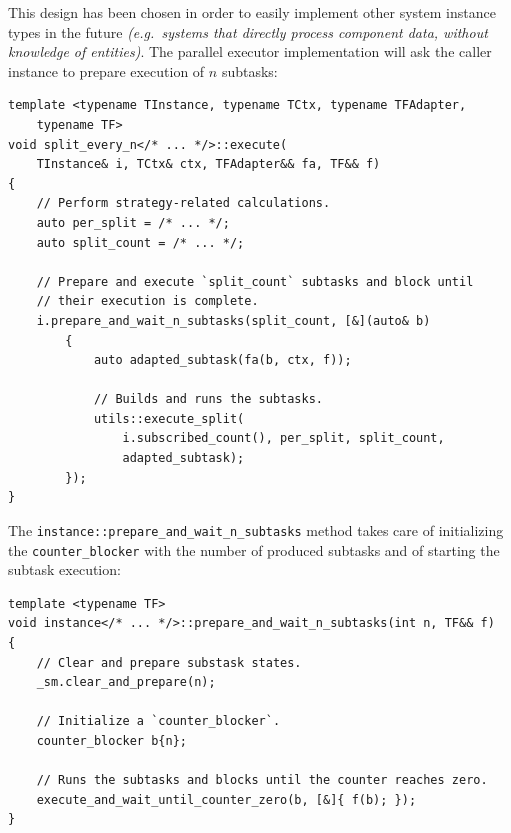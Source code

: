 \documentclass[twoside, 12pt, a4paper, openany]{book}
\begin{document}
This design has been chosen in order to easily implement other system
instance types in the future \emph{(e.g.~systems that directly process
component data, without knowledge of entities)}. The parallel executor
implementation will ask the caller instance to prepare execution of
\(n\) subtasks:

\begin{verbatim}
template <typename TInstance, typename TCtx, typename TFAdapter,
    typename TF>
void split_every_n</* ... */>::execute(
    TInstance& i, TCtx& ctx, TFAdapter&& fa, TF&& f)
{
    // Perform strategy-related calculations.
    auto per_split = /* ... */;
    auto split_count = /* ... */;

    // Prepare and execute `split_count` subtasks and block until
    // their execution is complete.
    i.prepare_and_wait_n_subtasks(split_count, [&](auto& b)
        {
            auto adapted_subtask(fa(b, ctx, f));

            // Builds and runs the subtasks.
            utils::execute_split(
                i.subscribed_count(), per_split, split_count,
                adapted_subtask);
        });
}
\end{verbatim}

The
\texttt{instance::prepare_and_wait_n_subtasks}
method takes care of initializing the
\texttt{counter_blocker}
with the number of produced subtasks and of starting the subtask
execution:

\begin{verbatim}
template <typename TF>
void instance</* ... */>::prepare_and_wait_n_subtasks(int n, TF&& f)
{
    // Clear and prepare substask states.
    _sm.clear_and_prepare(n);

    // Initialize a `counter_blocker`.
    counter_blocker b{n};

    // Runs the subtasks and blocks until the counter reaches zero.
    execute_and_wait_until_counter_zero(b, [&]{ f(b); });
}
\end{verbatim}
\end{document}
